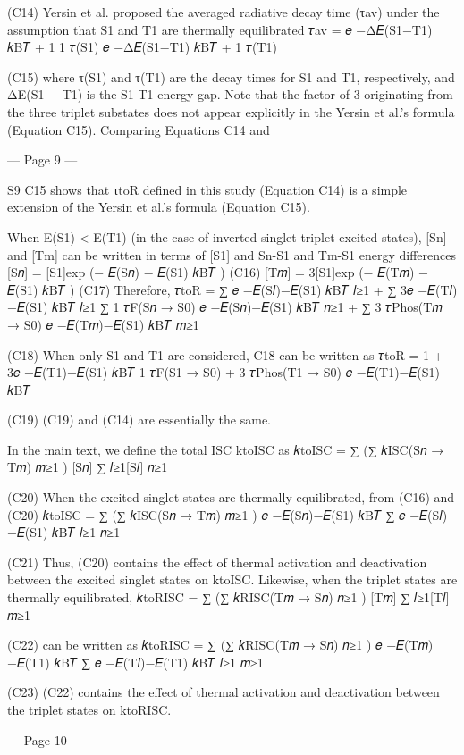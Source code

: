 (C14) 
Yersin et al. proposed the averaged radiative decay time (τav) under the assumption that S1 
and T1 are thermally equilibrated 
𝜏av =
𝑒
−Δ𝐸(S1−T1)
𝑘B𝑇
+ 1
1
𝜏(S1) 𝑒
−Δ𝐸(S1−T1)
𝑘B𝑇
+
1
𝜏(T1)
 
(C15) 
where τ(S1) and τ(T1) are the decay times for S1 and T1, respectively, and ΔE(S1 − T1) is the 
S1-T1 energy gap. Note that the factor of 3 originating from the three triplet substates does not 
appear explicitly in the Yersin et al.'s formula (Equation C15). Comparing Equations C14 and 


--- Page 9 ---
 
S9 
C15 shows that τtoR defined in this study (Equation C14) is a simple extension of the Yersin 
et al.'s formula (Equation C15). 
 
When E(S1) < E(T1) (in the case of inverted singlet-triplet excited states), [Sn] and [Tm] can 
be written in terms of [S1] and Sn-S1 and Tm-S1 energy differences  
[S𝑛] = [S1]exp (− 𝐸(S𝑛) − 𝐸(S1)
𝑘B𝑇
) 
(C16) 
[T𝑚] = 3[S1]exp (− 𝐸(T𝑚) − 𝐸(S1)
𝑘B𝑇
) 
(C17) 
Therefore, 
𝜏toR =
∑
𝑒
−𝐸(S𝑙)−𝐸(S1)
𝑘B𝑇
𝑙≥1
+ ∑
3𝑒
−𝐸(T𝑙)−𝐸(S1)
𝑘B𝑇
𝑙≥1
∑
1
𝜏F(S𝑛 → S0) 𝑒
−𝐸(S𝑛)−𝐸(S1)
𝑘B𝑇
𝑛≥1
+ ∑
3
𝜏Phos(T𝑚 → S0) 𝑒
−𝐸(T𝑚)−𝐸(S1)
𝑘B𝑇
𝑚≥1
 
(C18) 
When only S1 and T1 are considered, C18 can be written as 
𝜏toR =
1 + 3𝑒
−𝐸(T1)−𝐸(S1)
𝑘B𝑇
1
𝜏F(S1 → S0) +
3
𝜏Phos(T1 → S0) 𝑒
−𝐸(T1)−𝐸(S1)
𝑘B𝑇
 
(C19) 
(C19) and (C14) are essentially the same. 
 
In the main text, we define the total ISC ktoISC as 
𝑘toISC = ∑ (∑ 𝑘ISC(S𝑛 → T𝑚)
𝑚≥1
)
[S𝑛]
∑
𝑙≥1[S𝑙]
𝑛≥1
 
(C20) 
When the excited singlet states are thermally equilibrated, from (C16) and (C20) 
𝑘toISC = ∑ (∑ 𝑘ISC(S𝑛 → T𝑚)
𝑚≥1
)
𝑒
−𝐸(S𝑛)−𝐸(S1)
𝑘B𝑇
∑
𝑒
−𝐸(S𝑙)−𝐸(S1)
𝑘B𝑇
𝑙≥1
𝑛≥1
 
(C21) 
Thus, (C20) contains the effect of thermal activation and deactivation between the excited 
singlet states on ktoISC. Likewise, when the triplet states are thermally equilibrated,  
𝑘toRISC = ∑ (∑ 𝑘RISC(T𝑚 → S𝑛)
𝑛≥1
)
[T𝑚]
∑
𝑙≥1[T𝑙]
𝑚≥1
 
(C22) 
can be written as 
𝑘toRISC = ∑ (∑ 𝑘RISC(T𝑚 → S𝑛)
𝑛≥1
)
𝑒
−𝐸(T𝑚)−𝐸(T1)
𝑘B𝑇
∑
𝑒
−𝐸(T𝑙)−𝐸(T1)
𝑘B𝑇
𝑙≥1
𝑚≥1
 
(C23) 
(C22) contains the effect of thermal activation and deactivation between the triplet states on 
ktoRISC. 


--- Page 10 ---
 
